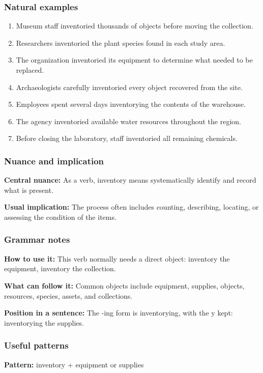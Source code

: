 \documentclass[11pt]{article}
\begin{document}
\subsubsection{Natural examples}
\begin{enumerate}
  \item Museum staff inventoried thousands of objects before moving the collection.
  \item Researchers inventoried the plant species found in each study area.
  \item The organization inventoried its equipment to determine what needed to be replaced.
  \item Archaeologists carefully inventoried every object recovered from the site.
  \item Employees spent several days inventorying the contents of the warehouse.
  \item The agency inventoried available water resources throughout the region.
  \item Before closing the laboratory, staff inventoried all remaining chemicals.
\end{enumerate}

\subsubsection{Nuance and implication}
\textbf{Central nuance:} As a verb, inventory means systematically identify and record what is present.

\textbf{Usual implication:} The process often includes counting, describing, locating, or assessing the condition of the items.

\subsubsection{Grammar notes}
\textbf{How to use it:} This verb normally needs a direct object: inventory the equipment, inventory the collection.

\textbf{What can follow it:} Common objects include equipment, supplies, objects, resources, species, assets, and collections.

\textbf{Position in a sentence:} The -ing form is inventorying, with the y kept: inventorying the supplies.

\subsubsection{Useful patterns}
\textbf{Pattern:} inventory + equipment or supplies
\end{document}
